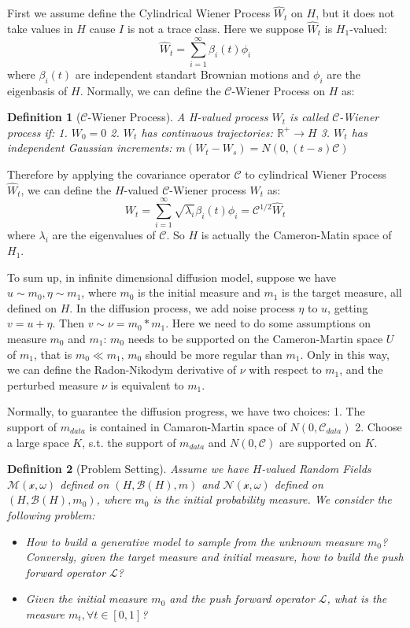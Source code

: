 \documentclass{article}
\newtheorem{definition}{Definition}
\begin{document}
First we assume define the Cylindrical Wiener Process $\hat{W}_t$ on $H$, but it does not take values in $H$ cause $I$ is not a trace class.
Here we suppose $\hat{W}_t$ is $H_1$-valued:
\begin{equation}
  \hat{W}_t = \sum_{i=1}^{\infty} \beta_i(t) \phi_i
\end{equation}
where $\beta_i(t)$ are independent standart Brownian motions and $\phi_i$ are the eigenbasis of $H$.
Normally, we can define the $\mathcal{C}$-Wiener Process on $H$ as:
\begin{definition}[$\mathcal{C}$-Wiener Process]
  A H-valued process $W_t$ is called $\mathcal{C}$-Wiener process if:
  1. $W_0 = 0$
  2. $W_t$ has continuous trajectories: $\mathbb{R}^+\rightarrow H$
  3. $W_t$ has independent Gaussian increments: $m(W_t - W_s) = N(0, (t-s)\mathcal{C})$
\end{definition}
Therefore by applying the covariance operator $\mathcal{C}$ to cylindrical Wiener Process $\hat{W}_t$, we can define the $H$-valued $\mathcal{C}$-Wiener process $W_t$ as:
\begin{equation}
  W_t = \sum_{i=1}^{\infty} \sqrt{\lambda_i} \beta_i(t) \phi_i = \mathcal{C}^{1/2}\hat{W}_t
\end{equation}
where $\lambda_i$ are the eigenvalues of $\mathcal{C}$. 
So $H$ is actually the Cameron-Matin space of $H_1$.

To sum up, in infinite dimensional diffusion model, suppose we have $u\sim m_0, \eta\sim m_1$, where $m_0$ is the initial measure and $m_1$ is the target measure, all defined on $H$.
In the diffusion process, we add noise process $\eta$ to $u$, getting $v = u + \eta$. Then $v\sim \nu=m_0 * m_1$. Here we need to do some assumptions on measure $m_0$ and $m_1$: 
$m_0$ needs to be supported on the Cameron-Martin space $U$ of $m_1$, that is $m_0 \ll m_1$, $m_0$ should be more regular than $m_1$. 
Only in this way, we can define the Radon-Nikodym derivative of $\nu$ with respect to $m_1$, and the perturbed measure $\nu$ is equivalent to $m_1$.

Normally, to guarantee the diffusion progress, we have two choices: 1. The support of $m_{data}$ is contained in Camaron-Martin space of $N(0, \mathcal{C}_{data})$ 2. Choose a large space $K$, s.t. the support of $m_{data}$ and $N(0, \mathcal{C})$ are supported on $K$.

\begin{definition}[Problem Setting]
  Assume we have $H$-valued Random Fields $\mathcal{M(x, \omega)}$ defined on $(H, \mathcal{B}(H), m)$ and $\mathcal{N(x, \omega)}$ defined on $(H, \mathcal{B}(H), m_0)$, where $m_0$ is the initial probability measure.
  We consider the following problem: 
  \begin{itemize}
    \item How to build a generative model to sample from the unknown measure $m_0$? 
    Conversly, given the target measure and initial measure, how to build the push forward operator $\mathcal{L}$?
    \item Given the initial measure $m_0$ and the push forward operator $\mathcal{L}$, what is the measure $m_t, \forall t\in [0, 1]$?
  \end{itemize}
\end{definition}
\end{document}
